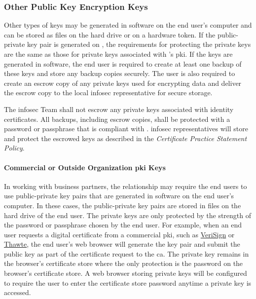 \subsubsection{Other Public Key Encryption Keys}
Other types of keys may be generated in software on the end user's computer and can be stored as files on the hard drive or on a hardware token.  
If the public-private key pair is generated on \smartcard{}, the requirements for protecting the private keys are the same as those for private keys associated with \CompanyName{}'s \gls{pki}.  
If the keys are generated in software, the end user is required to create at least one backup of these keys and store any backup copies securely.  
The user is also required to create an escrow copy of any private keys used for encrypting data and deliver the escrow copy to the local \gls{infosec} representative for secure storage. 

The \gls{infosec} Team shall not escrow any private keys associated with identity certificates.  
All backups, including escrow copies, shall be protected with a password or passphrase that is compliant with \CompanyName{} .
\gls{infosec}{} representatives will store and protect the escrowed keys as described in the \CompanyName{} \textsl{Certificate Practice Statement Policy}.%
\paragraph{Commercial or Outside Organization \gls{pki} Keys}
In working with business partners, the relationship may require the end users to use public-private key pairs that are generated in software on the end user's computer.  
In these cases, the public-private key pairs are stored in files on the hard drive of the end user.  
The private keys are only protected by the strength of the password or passphrase chosen by the end user.  
For example, when an end user requests a digital certificate from a commercial \gls{pki}, such as \href{http://www.verisign.com/}{VeriSign} or \href{https://www.thawte.com/}{Thawte}, the end user's web browser will generate the key pair and submit the public key as part of the certificate request to the \gls{ca}.  
The private key remains in the browser's certificate store where the only protection is the password on the browser's certificate store.  
A web browser storing private keys will be configured to require the user to enter the certificate store password anytime a private key is accessed.
